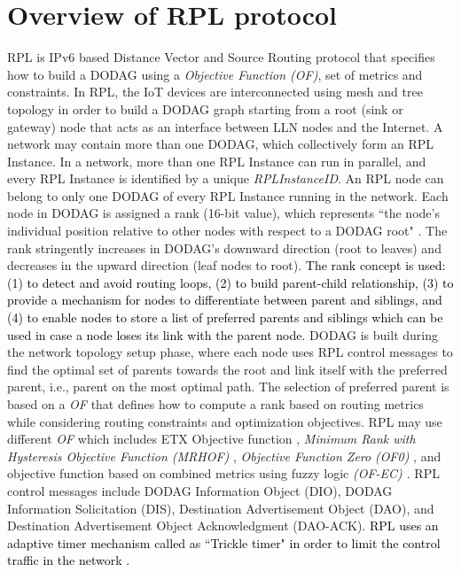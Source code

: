 \documentclass[10pt,journal,sort & compress]{IEEEtran}
\begin{document}
\section{Overview of RPL protocol}\label{RPL Concepts and Security Concerns}
RPL is IPv6 based Distance Vector and Source Routing protocol that specifies how to build a DODAG using a \textit{Objective Function (OF)}, set of metrics and constraints. In RPL, the IoT devices are interconnected using mesh and tree topology in order to build a DODAG graph starting from a root (sink or gateway) node that acts as an interface between LLN nodes and the Internet. A network may contain more than one DODAG, which collectively form an RPL Instance. In a network, more than one RPL Instance can run in parallel, and every RPL Instance is identified by a unique \textit{RPLInstanceID}. An RPL node can belong to only one DODAG of every RPL Instance running in the network. Each node in DODAG is assigned a rank (16-bit value), which represents ``the node's individual position relative to other nodes with respect to a DODAG root" \cite{winter2012rpl}. The rank stringently increases in DODAG's downward direction (root to leaves) and decreases in the upward direction (leaf nodes to root). \textcolor{black}{The rank concept is used: (1) to detect and avoid routing loops, (2) to build parent-child relationship, (3) to provide a mechanism for nodes to differentiate between parent and siblings, and (4) to enable nodes to store a list of preferred parents and siblings which can be used in case a node loses its link with the parent node.} DODAG is built during the network topology setup phase, where each node uses RPL control messages to find the optimal set of parents towards the root and link itself with the preferred parent, i.e., parent on the most optimal path. The selection of preferred parent is based on a \textit{OF} that defines how to compute a rank based on routing metrics while considering routing constraints and optimization objectives. RPL may use different \textit{OF} \cite{lamaazi2020comprehensive} which includes ETX Objective function \cite{ETXOF}, \textit{Minimum Rank with Hysteresis Objective Function (MRHOF)} \cite{MRHOF}, \textit{Objective Function Zero} \textit{(OF0)} \cite{OF0}, and objective function based on combined metrics using fuzzy logic \textit{(OF-EC) \cite{lamaazi2018ec}}. RPL control messages include DODAG Information Object (DIO), DODAG Information Solicitation (DIS), Destination Advertisement Object (DAO), and Destination Advertisement Object Acknowledgment (DAO-ACK). \textcolor{black}{RPL uses an adaptive timer mechanism called as ``Trickle timer" in order to limit the control traffic in the network \cite{levis2011trickle}.} 
\end{document}
